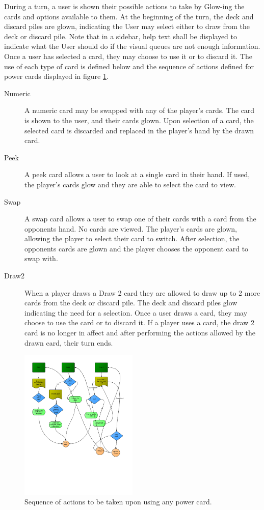 \documentclass[12pt]{IEEEtran}
\begin{document}
	During a turn, a user is shown their possible actions to take by Glow-ing the cards and options available to them. At the beginning of the turn, the deck and discard piles are glown, indicating the User may select either to draw from the deck or discard pile. Note that in a sidebar, help text shall be displayed to indicate what the User should do if the visual queues are not enough information. Once a user has selected a card, they may choose to use it or to discard it. The use of each type of card is defined below and the sequence of actions defined for power cards displayed in figure \ref{fig:powact}.
	\begin{description}
		\item[Numeric] \hspace{1em} A numeric card may be swapped with any of the player's cards. The card is shown to the user, and their cards glown. Upon selection of a card, the selected card is discarded and replaced in the player's hand by the drawn card.
		\item[Peek] A peek card allows a user to look at a single card in their hand. If used, the player's cards glow and they are able to select the card to view.
		\item[Swap] A swap card allows a user to swap one of their cards with a card from the opponents hand. No cards are viewed. The player's cards are glown, allowing the player to select their card to switch. After selection, the opponents cards are glown and the player chooses the opponent card to swap with. 
		\item[Draw2] When a player draws a Draw 2 card they are allowed to draw up to 2 more cards from the deck or discard pile. The deck and discard piles glow indicating the need for a selection. Once a user draws a card, they may choose to use the card or to discard it. If a player uses a card, the draw 2 card is no longer in affect and after performing the actions allowed by the drawn card, their turn ends. 
	\end{description}
	
	\begin{figure}[h]
		\centering
		\includegraphics[width=0.5\textwidth]{powercardactions.png}
		\caption{Sequence of actions to be taken upon using any power card.}
		\label{fig:powact}
	\end{figure}
\end{document}
